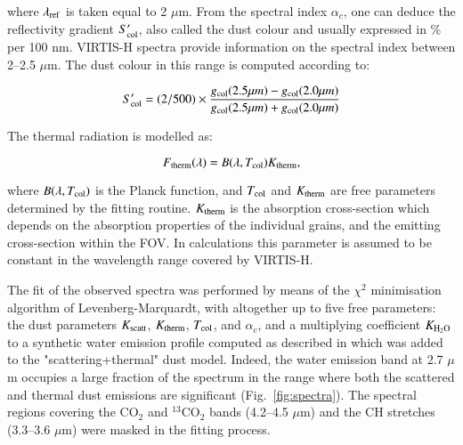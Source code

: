 \documentclass[a4paper,fleqn,usenatbib]{mnras}
\begin{document}

\noindent where $\lambda_{\rm ref}$ is taken equal to 2 $\mu$m.
From the spectral index $\alpha_c$, one can deduce the
reflectivity gradient $S'_{\rm col}$, also called the dust
colour and usually expressed in \% per 100 nm. VIRTIS-H spectra
provide information on the spectral index between 2--2.5 $\mu$m.
The dust colour in this range is computed according to:

\begin{equation}\label{eq:5}
S'_{\rm col} = (2/500) \times \frac{g_{\rm col}(2.5\mu m)-g_{\rm
col}(2.0\mu m)}{g_{\rm col}(2.5\mu m)+g_{\rm col}(2.0\mu m)}
\end{equation}


The thermal radiation is modelled as:

\begin{equation}\label{eq:6}
F_{\rm therm}(\lambda) = B(\lambda,T_{\rm col}) K_{\rm therm},
\end{equation}

\noindent
where $B(\lambda,T_{\rm col})$  is the Planck function, and  $T_{\rm col}$ and $K_{\rm therm}$ are free parameters determined by the fitting routine.  $K_{\rm therm}$ is the absorption cross-section which depends  on the absorption properties of the individual grains, and the emitting cross-section within the FOV. In calculations this parameter is assumed to be constant in the wavelength range covered by VIRTIS-H.



The fit of the observed spectra was performed by means of the $\chi^2$ minimisation algorithm of Levenberg-Marquardt, with altogether up to five free parameters: the dust parameters $K_{\rm scatt}$, $K_{\rm therm}$, $T_{\rm col}$, and $\alpha_c$, and a multiplying coefficient $K_{\rm H_2O}$ to a synthetic water emission profile computed as described in \citet{dbm2016} which was added to the "scattering+thermal" dust model. Indeed, the water emission band at 2.7 $\mu$m occupies a large fraction of the spectrum in the range where both the scattered and thermal dust emissions are significant (Fig.~\ref{fig:spectra}). The spectral regions covering the CO$_2$ and $^{13}$CO$_2$ bands  (4.2--4.5 $\mu$m) and 
the CH stretches (3.3--3.6 $\mu$m) were masked in the fitting process. 
\end{document}
